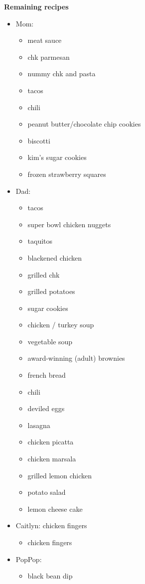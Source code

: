 \documentclass{article}
\begin{document}
\textbf{Remaining recipes}
\begin{itemize}
    \item Mom:
          \begin{itemize}
              \item meat sauce
              \item  chk parmesan
              \item  nummy chk and pasta
              \item  tacos
              \item  chili
              \item  peanut butter/chocolate chip cookies
              \item  biscotti
              \item  kim's sugar cookies
              \item  frozen strawberry squares
          \end{itemize}

    \item Dad:
          \begin{itemize}
              \item  tacos
              \item  super bowl chicken nuggets
              \item  taquitos
              \item  blackened chicken
              \item  grilled chk
              \item  grilled potatoes
              \item  sugar cookies
              \item  chicken / turkey soup
              \item  vegetable soup
              \item  award-winning (adult) brownies
              \item  french bread
              \item  chili
              \item  deviled eggs
              \item  lasagna
              \item  chicken picatta
              \item  chicken marsala
              \item  grilled lemon chicken
              \item  potato salad
              \item  lemon cheese cake
          \end{itemize}

    \item Caitlyn: chicken fingers
          \begin{itemize}
              \item chicken fingers
          \end{itemize}

    \item PopPop:
          \begin{itemize}
              \item black bean dip
          \end{itemize}
\end{itemize}
\end{document}
